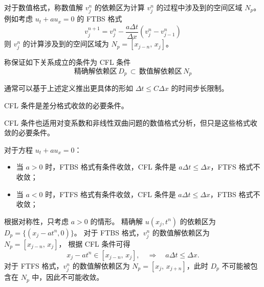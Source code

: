 对于数值格式，称数值解 $v_j^n$ 的依赖区为计算 $v_j^n$ 的过程中涉及到的空间区域 $N_p$。
例如考虑 $u_t + a u_x = 0$ 的 FTBS 格式
\[
    v_{j}^{n+1} = v_j^n - \frac{a \Delta t}{\Delta x} \left(v_{j}^n - v_{j-1}^n\right)
\]
则 $v_j^n$ 的计算涉及到的空间区域为 $N_p = [x_{j-n},\, x_j]$。

\begin{definition}
    称保证如下关系成立的条件为 CFL 条件
    \[
        \text{精确解依赖区}\,D_p \,\subset\, \text{数值解依赖区}\,N_p
    \]
\end{definition}

\begin{remark}
    通常可以基于上述定义推出更具体的形如 $\Delta t \le C \Delta x$ 的时间步长限制。
\end{remark}

\begin{theorem}
    CFL 条件是差分格式收敛的必要条件。
\end{theorem}

\begin{remark}
    CFL 条件也适用对变系数和非线性双曲问题的数值格式分析，但只是这些格式收敛的必要条件。
\end{remark}

\begin{example}\label{eg:upwind}
    对于方程 $u_t + a u_x = 0$：
    \begin{itemize}
        \item 当 $a > 0$ 时，FTBS 格式有条件收敛，CFL 条件是 $a \Delta t \le \Delta x$，FTFS 格式不收敛；
        \item 当 $a < 0$ 时，FTFS 格式有条件收敛，CFL 条件是 $a \Delta t \le \Delta x$，FTBS 格式不收敛；
    \end{itemize}
\end{example}

\begin{solution*}
    根据对称性，只考虑 $a>0$ 的情形。
    精确解 $u(x_j,t^n)$ 的依赖区为 $D_p = \{(x_j - a t^n,0)\}$。
    对于 FTBS 格式，$v_j^n$ 的数值解依赖区为 $N_p = [x_{j-n},\, x_{j}]$，
    根据 CFL 条件可得
    \[
        x_j - a t^n \in [x_{j-n},\, x_{j}],
        \quad \Rightarrow \quad a \Delta t \le \Delta x.
    \]
    对于 FTFS 格式，$v_j^n$ 的数值解依赖区为 $N_p = [x_{j},\, x_{j+n}]$，此时 $D_p$ 不可能被包含在 $N_p$ 中，因此不可能收敛。
\end{solution*}



